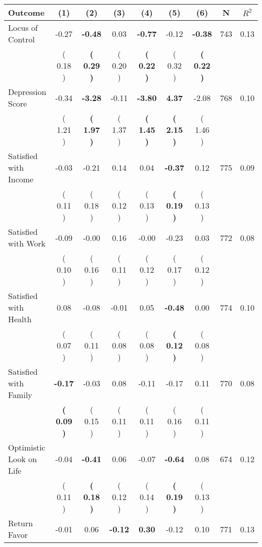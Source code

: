\begin{tabular}{lcccccccc}
\toprule
 \textbf{Outcome} & \textbf{(1)} & \textbf{(2)} & \textbf{(3)} & \textbf{(4)} & \textbf{(5)} & \textbf{(6)} & \textbf{N} & \textbf{$ R^2$} \\
\midrule
Locus of Control &     -0.27 & \textbf{    -0.48} &      0.03 & \textbf{    -0.77} &     -0.12 & \textbf{    -0.38} & 743 &       0.13 \\ 
 & (     0.18 ) & \textbf{(     0.29 )} & (     0.20 ) & \textbf{(     0.22 )} & (     0.32 ) & \textbf{(     0.22 )} & \\
Depression Score &     -0.34 & \textbf{    -3.28} &     -0.11 & \textbf{    -3.80} & \textbf{     4.37} &     -2.08 & 768 &       0.10 \\ 
 & (     1.21 ) & \textbf{(     1.97 )} & (     1.37 ) & \textbf{(     1.45 )} & \textbf{(     2.15 )} & (     1.46 ) & \\
Satisfied with Income &     -0.03 &     -0.21 &      0.14 &      0.04 & \textbf{    -0.37} &      0.12 & 775 &       0.09 \\ 
 & (     0.11 ) & (     0.18 ) & (     0.12 ) & (     0.13 ) & \textbf{(     0.19 )} & (     0.13 ) & \\
Satisfied with Work &     -0.09 &     -0.00 &      0.16 &     -0.00 &     -0.23 &      0.03 & 772 &       0.08 \\ 
 & (     0.10 ) & (     0.16 ) & (     0.11 ) & (     0.12 ) & (     0.17 ) & (     0.12 ) & \\
Satisfied with Health &      0.08 &     -0.08 &     -0.01 &      0.05 & \textbf{    -0.48} &      0.00 & 774 &       0.10 \\ 
 & (     0.07 ) & (     0.11 ) & (     0.08 ) & (     0.08 ) & \textbf{(     0.12 )} & (     0.08 ) & \\
Satisfied with Family & \textbf{    -0.17} &     -0.03 &      0.08 &     -0.11 &     -0.17 &      0.11 & 770 &       0.08 \\ 
 & \textbf{(     0.09 )} & (     0.15 ) & (     0.11 ) & (     0.11 ) & (     0.16 ) & (     0.11 ) & \\
Optimistic Look on Life &     -0.04 & \textbf{    -0.41} &      0.06 &     -0.07 & \textbf{    -0.64} &      0.08 & 674 &       0.12 \\ 
 & (     0.11 ) & \textbf{(     0.18 )} & (     0.12 ) & (     0.14 ) & \textbf{(     0.19 )} & (     0.13 ) & \\
Return Favor &     -0.01 &      0.06 & \textbf{    -0.12} & \textbf{     0.30} &     -0.12 &      0.10 & 771 &       0.13 \\ 

\end{tabular}

